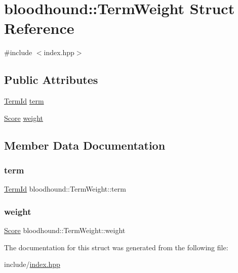 \hypertarget{structbloodhound_1_1TermWeight}{}\section{bloodhound\+:\+:Term\+Weight Struct Reference}
\label{structbloodhound_1_1TermWeight}


{\ttfamily \#include $<$index.\+hpp$>$}

\subsection*{Public Attributes}
\begin{DoxyCompactItemize}
\item 
\hyperlink{structbloodhound_1_1TermId}{Term\+Id} \hyperlink{structbloodhound_1_1TermWeight_a8606421116b89015b89272bd5e2602a9}{term}
\item 
\hyperlink{structbloodhound_1_1Score}{Score} \hyperlink{structbloodhound_1_1TermWeight_a1abc2c53928fbaa8dcf617e72e1afced}{weight}
\end{DoxyCompactItemize}


\subsection{Member Data Documentation}
\mbox{\label{structbloodhound_1_1TermWeight_a8606421116b89015b89272bd5e2602a9}} 
\subsubsection{\texorpdfstring{term}{term}}
{\footnotesize\ttfamily \hyperlink{structbloodhound_1_1TermId}{Term\+Id} bloodhound\+::\+Term\+Weight\+::term}

\mbox{\label{structbloodhound_1_1TermWeight_a1abc2c53928fbaa8dcf617e72e1afced}} 
\subsubsection{\texorpdfstring{weight}{weight}}
{\footnotesize\ttfamily \hyperlink{structbloodhound_1_1Score}{Score} bloodhound\+::\+Term\+Weight\+::weight}



The documentation for this struct was generated from the following file\+:\begin{DoxyCompactItemize}
\item 
include/\hyperlink{index_8hpp}{index.\+hpp}\end{DoxyCompactItemize}
